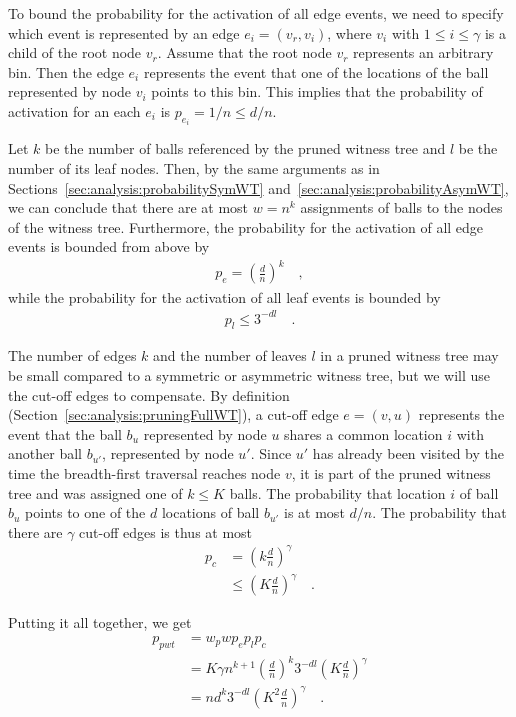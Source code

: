 \documentclass[a4paper,12pt]{article}
\begin{document}
To bound the probability for the activation of all edge events, we need to specify which event is represented by an edge $e_i = (v_r, v_i)$, where $v_i$ with $1 \leq i \leq \gamma$ is a child of the root node $v_r$. Assume that the root node $v_r$ represents an arbitrary bin. Then the edge $e_i$ represents the event that one of the locations of the ball represented by node $v_i$ points to this bin. This implies that the probability of activation for an each $e_i$ is $p_{e_i} = 1/n \leq d/n$. 

Let $k$ be the number of balls referenced by the pruned witness tree and $l$ be the number of its leaf nodes. Then, by the same arguments as in Sections~\ref{sec:analysis:probabilitySymWT} and~\ref{sec:analysis:probabilityAsymWT}, we can conclude that there are at most $w=n^k$ assignments of balls to the nodes of the witness tree. Furthermore, the probability for the activation of all edge events is bounded from above by 
\begin{align*}
p_e = \left(\frac{d}{n}\right)^{k}\quad ,
\end{align*}
while the probability for the activation of all leaf events is bounded by 
\begin{align*}
p_l \leq 3^{-d l}\quad .
\end{align*} 

The number of edges $k$ and the number of leaves $l$ in a pruned witness tree may be small compared to a symmetric or asymmetric witness tree, but we will use the cut-off edges to compensate. By definition (Section~\ref{sec:analysis:pruningFullWT}), a cut-off edge $e=(v, u)$ represents the event that the ball $b_u$ represented by node $u$ shares a common location $i$ with another ball $b_{u'}$, represented by node $u'$. Since $u'$ has already been visited by the time the breadth-first traversal reaches node $v$, it is part of the pruned witness tree and was assigned one of $k\leq K$ balls. The probability that location $i$ of ball $b_u$ points to one of the $d$ locations of ball $b_{u'}$ is at most $d/n$. The probability that there are $\gamma$ cut-off edges is thus at most 
\begin{align*}
p_c &= \left(k \frac{d}{n}\right)^\gamma \\
    & \leq \left(K \frac{d}{n}\right)^\gamma \quad .
\end{align*}

Putting it all together, we get 
\begin{align*}
p_{pwt} &= w_p w  p_e  p_l  p_c \\
		&= K\gamma n^{k+1} \left(\frac{d}{n}\right)^k3^{-d l}  \left(K \frac{d}{n}\right)^\gamma\\
		&= n  d^k 3^{-d l}  \left(K^2 \frac{d}{n} \right)^\gamma \quad .
\end{align*}
\end{document}
